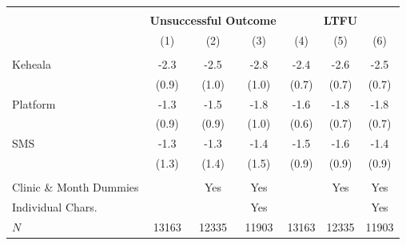 \scriptsize{
\begin{tabular}{l*{6}{c}}
\hline\hline \\[-8pt]
 & \multicolumn{3}{c}{\textbf{Unsuccessful Outcome}} & \multicolumn{3}{c}{\textbf{LTFU}} \\
\rowcolor{yellow!15}            &\multicolumn{1}{c}{(1)}&\multicolumn{1}{c}{(2)}&\multicolumn{1}{c}{(3)}&\multicolumn{1}{c}{(4)}&\multicolumn{1}{c}{(5)}&\multicolumn{1}{c}{(6)}\\
\hline \\[-8pt]
Keheala & -2.3\sym{*} & -2.5\sym{**} & -2.8\sym{**} & -2.4\sym{***} & -2.6\sym{***} & -2.5\sym{***} \\
            &   (0.9) &   (1.0) &   (1.0) &   (0.7) &   (0.7) &   (0.7)         \\
[0.4em]
Platform & -1.3 & -1.5 & -1.8 & -1.6\sym{*} & -1.8\sym{**} & -1.8\sym{**} \\
            &   (0.9) &   (0.9) &   (1.0) &   (0.6) &   (0.7) &   (0.7)         \\
[0.4em]
SMS & -1.3 & -1.3 & -1.4 & -1.5 & -1.6 & -1.4 \\
            &   (1.3) &   (1.4) &   (1.5) &   (0.9) &   (0.9) &   (0.9)         \\
[0.4em]
\hline
\hline \\[-8pt]
Clinic \& Month Dummies & & Yes & Yes & & Yes & Yes \\
Individual Chars. & & & Yes & & & Yes \\
\(N\)       &       13163         &       12335         &       11903         &       13163         &       12335         &       11903         \\
\hline\hline
\end{tabular}
}